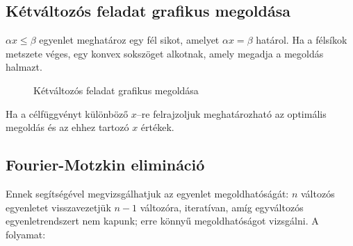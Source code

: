 \subsection{Kétváltozós feladat grafikus megoldása}

$\alpha x \leq \beta$ egyenlet meghatároz egy fél sikot, amelyet $\alpha x = \beta$
határol. Ha a félsíkok metszete véges, egy konvex sokszöget alkotnak, amely megadja a
megoldás halmazt.

\begin{figure}[htbp]
\centering
{}
\caption{Kétváltozós feladat grafikus megoldása} \label{fig:KetValtGraf}
\end{figure}

Ha a célfüggvényt különböző $x$--re felrajzoljuk meghatározható az optimális megoldás és az
ehhez tartozó $x$ értékek.

\subsection{Fourier-Motzkin elimináció}

Ennek segítségével megvizsgálhatjuk az egyenlet megoldhatóságát: $n$ változós egyenletet
visszavezetjük $n-1$ változóra, iteratívan, amíg egyváltozós egyenletrendszert nem kapunk;
erre könnyű megoldhatóságot vizsgálni. A folyamat:


